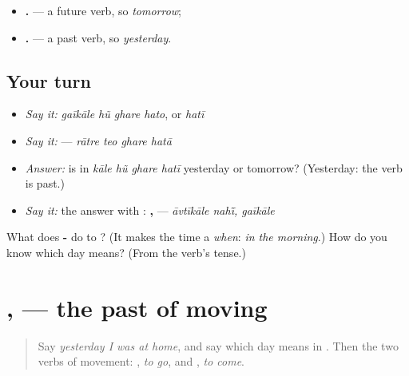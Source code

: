 \begin{itemize}
\raggedright
  \item \textbf{ .} — a future verb, so \emph{tomorrow};
  \item \textbf{   .} — a past verb, so \emph{yesterday}.
\end{itemize}

\subsection*{Your turn}
\begin{itemize}
\raggedright
  \item \emph{Say it:} \emph{gaīkāle hũ ghare hato}, or \emph{hatī}
  \item \emph{Say it:} \textbf{   } — \emph{rātre teo ghare hatā}
  \item \emph{Answer:} is \textbf{} in \emph{kāle hũ ghare hatī} yesterday or tomorrow? (Yesterday: the verb is past.)
  \item \emph{Say it:} the answer with \textbf{}: \textbf{ , } — \emph{āvtīkāle nahī̃, gaīkāle}
\end{itemize}

\begin{tcolorbox}[breakable,colback=teal!4,colframe=teal!35!black,title={Before you move on}]
What does \textbf{-} do to \textbf{}? (It makes the time a \emph{when}: \emph{in the morning}.) How do you know which day \textbf{} means? (From the verb's tense.)
\end{tcolorbox}
\section[\texorpdfstring{\gu{ગયો} · \gu{ગઈ} · \gu{ગયું} … (gayo · gaī …)}{ગયો · ગઈ · ગયું … (gayo · gaī …)}]{ ,   — the past of moving}

\label{lesson:GU-C147-gayo}



\begin{quote}
Say \emph{yesterday I was at home}, and say which day \textbf{} means in \textbf{ }. Then the two verbs of movement: \textbf{}, \emph{to go}, and \textbf{}, \emph{to come}.
\end{quote}

